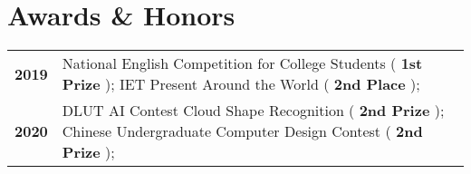 \documentclass[a4,10pt]{article}
\newenvironment{zitemize}{
\begin{itemize}\itemsep0pt \parskip0pt \parsep1pt}
{\end{itemize}\vspace{-0.5cm}}
\newcommand{\hskills}[1]{
\textbf{\bfseries #1} }
\begin{document}






\section{Awards \& Honors}
\vspace{-0.2cm}
\begin{tabular}[t]{ p{4em} p{50em}}
\hskills{2019} & National English Competition for College Students (\hskills{1st Prize}); IET Present Around the World (\hskills{2nd Place}); \\ %
\hskills{2020} & DLUT AI Contest Cloud Shape Recognition (\hskills{2nd Prize}); Chinese Undergraduate Computer Design Contest (\hskills{2nd Prize});\\
\end{tabular} 

\end{document}
